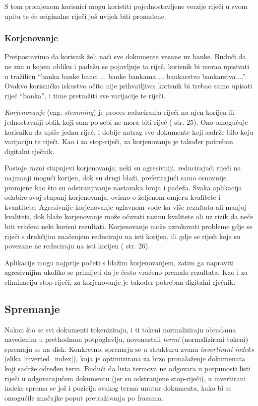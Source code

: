 \documentclass[a4paper,twoside,12pt]{scrreprt}
\begin{document}
S tom promjenom korisnici mogu koristiti pojednostavljene verzije riječi u svom upitu te će originalne riječi još uvijek biti pronađene.

\subsubsection{Korjenovanje}

Pretpostavimo da korisnik želi naći sve dokumente vezane uz banke. Budući da ne zna u kojem obliku i padežu se pojavljuje ta riječ, korisnik bi morao upisivati u tražilicu ``banka banke banci ... banke bankama ... bankarstvo bankarstva ...''. Ovakvo korisničko iskustvo očito nije prihvatljivo; korisnik bi trebao samo upisati riječ ``banka'', i time pretražiti sve varijacije te riječi.

\textit{Korjenovanje} (eng. \textit{stemming}) je proces reduciranja riječi na njen korijen ili jednostavniji oblik koji sam po sebi ne mora biti riječ (\cite{taming} str. 25). Ono omogućuje korisniku da upiše jednu riječ, i dobije natrag sve dokumente koji sadrže bilo koju varijaciju te riječi. Kao i za stop-riječi, za korjenovanje je također potreban digitalni rječnik.

Postoje razni stupnjevi korjenovanja; neki su agresivniji, reducirajući riječi na najmanji mogući korijen, dok su drugi blaži, preferirajući samo osnovnije promjene kao što su odstranjivanje nastavaka broja i padeža. Svaka aplikacija odabire svoj stupanj korjenovanja, ovisno o željenom omjeru kvalitete i kvantitete. Agresivnije korjenovanje uglavnom vode ka više rezultata ali manjoj kvaliteti, dok blaže korjenovanje može očuvati razinu kvalitete ali uz rizik da neće biti vraćeni neki korisni rezultati. Korjenovanje može uzrokovati probleme gdje se riječi s drukčijim značenjem reduciraju na isti korijen, ili gdje se riječi koje su povezane ne reduciraju na isti korijen (\cite{taming} str. 26).

Aplikacije mogu najprije početi s blažim korjenovanjem, zatim ga napraviti agresivnijim ukoliko se primijeti da je često vraćeno premalo rezultata. Kao i za eliminaciju stop-riječi, za korjenovanje je također potreban digitalni rječnik.

\subsection{Spremanje}

Nakon što se svi dokumenti tokeniziraju, i ti tokeni normaliziraju obradama navedenim u prethodnom potpoglavlju, novonastali \textit{termi} (normalizirani tokeni) spremaju se na disk. Konkretno, spremaju se u strukturu zvanu \textit{invertirani indeks} (slika \ref{inverted_index}), koja je optimizirana za brzo pronalaženje dokumenata koji sadrže određen term. Budući da lista termova ne odgovara u potpunosti listi riječi u odgovarajućem dokumentu (jer su odstranjene stop-riječi), u invertirani indeks sprema se još i pozicija svakog terma unutar dokumenta, kako bi se omogućile značajke poput pretraživanja po frazama.
\end{document}
